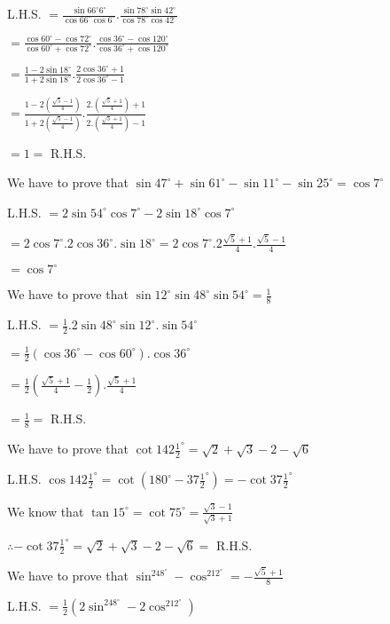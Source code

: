   L.H.S. $= \frac{\sin66^\circ6^\circ}{\cos66^\circ\cos6^\circ}.\frac{\sin78^\circ\sin42^\circ}{\cos78^\circ\cos42^\circ}$

  $= \frac{\cos60^\circ - \cos72^\circ}{\cos60^\circ + \cos72^\circ}.\frac{\cos36^\circ - \cos120^\circ}{\cos36^\circ +
    \cos120^\circ}$

  $= \frac{1 - 2\sin18^\circ}{1 + 2\sin18^\circ}.\frac{2\cos36^\circ + 1}{2\cos36^\circ - 1}$

  $= \frac{1 - 2\left(\frac{\sqrt{5} - 1}{4}\right)}{1 + 2\left(\frac{\sqrt{5} -
      1}{4}\right)}.\frac{2.\left(\frac{\sqrt{5} + 1}{4}\right) + 1}{2.\left(\frac{\sqrt{5} + 1}{4}\right) - 1}$

  $= 1 =$ R.H.S.

\item We have to prove that $\sin47^\circ + \sin61^\circ - \sin 11^\circ - \sin25^\circ = \cos 7^\circ$

  L.H.S. $= 2\sin54^\circ\cos7^\circ - 2\sin18^\circ\cos7^\circ$

  $= 2\cos7^\circ.2\cos36^\circ.\sin18^\circ = 2\cos7^\circ.2\frac{\sqrt{5} + 1}{4}.\frac{\sqrt{5} - 1}{4}$

  $= \cos7^\circ$

\item We have to prove that $\sin 12^\circ\sin48^\circ\sin54^\circ = \frac{1}{8}$

  L.H.S. $= \frac{1}{2}.2\sin48^\circ\sin12^\circ.\sin54^\circ$

  $= \frac{1}{2}(\cos 36^\circ - \cos60^\circ).\cos36^\circ$

  $= \frac{1}{2}\left(\frac{\sqrt{5} + 1}{4} - \frac{1}{2}\right).\frac{\sqrt{5} + 1}{4}$

  $= \frac{1}{8} =$ R.H.S.

\item We have to prove that $\cot 142\frac{1}{2}^\circ = \sqrt{2} + \sqrt{3} - 2 - \sqrt{6}$

  L.H.S. $\cos 142\frac{1}{2}^\circ = \cot\left(180^\circ - 37\frac{1}{2}^\circ\right) = -\cot37\frac{1}{2}^\circ$

  We know that $\tan 15^\circ = \cot 75^\circ = \frac{\sqrt{3} - 1}{\sqrt{3} + 1}$

  $\therefore -\cot37\frac{1}{2}^\circ = \sqrt{2} + \sqrt{3} - 2 - \sqrt{6} =$ R.H.S.

\item We have to prove that $\sin^248^\circ - \cos^212^\circ = -\frac{\sqrt{5} + 1}{8}$

  L.H.S. $= \frac{1}{2}\left(2\sin^248^\circ - 2\cos^212^\circ\right)$

